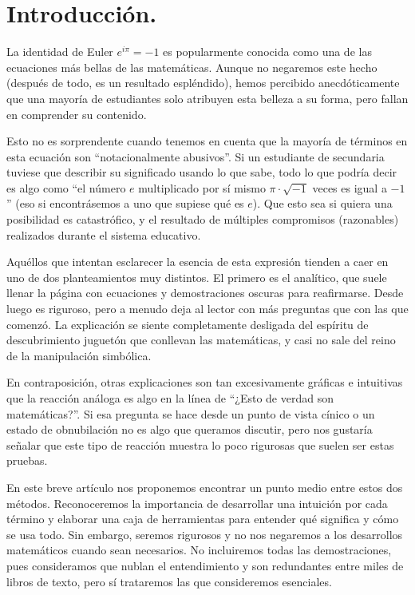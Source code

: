 \section{Introducción.}

La identidad de Euler $e^{i\pi} = -1$ es popularmente conocida como una de las ecuaciones más bellas de las matemáticas. Aunque no negaremos este hecho (después de todo, es un resultado espléndido), hemos percibido anecdóticamente que una mayoría de estudiantes solo atribuyen esta belleza a su forma, pero fallan en comprender su contenido.

Esto no es sorprendente cuando tenemos en cuenta que la mayoría de términos en esta ecuación son \enquote{notacionalmente abusivos}. Si un estudiante de secundaria tuviese que describir su significado usando lo que sabe, todo lo que podría decir es algo como \enquote{el número $e$ multiplicado por sí mismo $\pi\cdot\sqrt{-1}$ veces es igual a $-1$} (eso si encontrásemos a uno que supiese qué es $e$). Que esto sea si quiera una posibilidad es catastrófico, y el resultado de múltiples compromisos (razonables) realizados durante el sistema educativo.

Aquéllos que intentan esclarecer la esencia de esta expresión tienden a caer en uno de dos planteamientos muy distintos. El primero es el analítico, que suele llenar la página con ecuaciones y demostraciones oscuras para reafirmarse. Desde luego es riguroso, pero a menudo deja al lector con más preguntas que con las que comenzó. La explicación se siente completamente desligada del espíritu de descubrimiento juguetón que conllevan las matemáticas, y casi no sale del reino de la manipulación simbólica.

En contraposición, otras explicaciones son tan excesivamente gráficas e intuitivas que la reacción análoga es algo en la línea de \enquote{¿Esto de verdad son matemáticas?}. Si esa pregunta se hace desde un punto de vista cínico o un estado de obnubilación no es algo que queramos discutir, pero nos gustaría señalar que este tipo de reacción muestra lo poco rigurosas que suelen ser estas pruebas.

En este breve artículo nos proponemos encontrar un punto medio entre estos dos métodos. Reconoceremos la importancia de desarrollar una intuición por cada término y elaborar una caja de herramientas para entender qué significa y cómo se usa todo. Sin embargo, seremos rigurosos y no nos negaremos a los desarrollos matemáticos cuando sean necesarios. No incluiremos todas las demostraciones, pues consideramos que nublan el entendimiento y son redundantes entre miles de libros de texto, pero sí trataremos las que consideremos esenciales.


